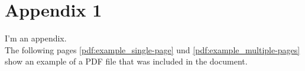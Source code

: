 

\section*{Appendix 1}

I'm an appendix.\\
The following pages \autoref{pdf:example_single-page} und \autoref{pdf:example_multiple-pages} show an example of a PDF file that was included in the document.

{}
